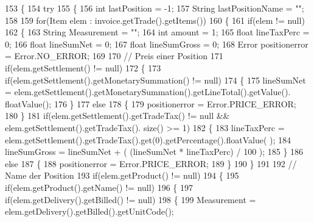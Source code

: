 \begin{DoxyCode}
153     \{
154         \textcolor{keywordflow}{try}
155         \{
156         \textcolor{keywordtype}{int} lastPosition = -1;
157         String lastPositionName = \textcolor{stringliteral}{""};
158         
159         \textcolor{keywordflow}{for}(Item elem : invoice.getTrade().getItems())
160         \{
161             \textcolor{keywordflow}{if}(elem != null)
162             \{
163                 String Measurement = \textcolor{stringliteral}{""};
164                 \textcolor{keywordtype}{int} amount = 1;
165                 \textcolor{keywordtype}{float} lineTaxPerc = 0;
166                 \textcolor{keywordtype}{float} lineSumNet = 0;
167                 \textcolor{keywordtype}{float} lineSumGross = 0;
168                 Error positionerror = Error.NO\_ERROR;
169                 
170                 \textcolor{comment}{// Preis einer Position}
171                 \textcolor{keywordflow}{if}(elem.getSettlement() != null)
172                 \{
173                     \textcolor{keywordflow}{if}(elem.getSettlement().getMonetarySummation() != null)
174                     \{
175                         lineSumNet = elem.getSettlement().getMonetarySummation().getLineTotal().getValue().
      floatValue();
176                     \}
177                     \textcolor{keywordflow}{else}
178                     \{
179                         positionerror = Error.PRICE\_ERROR;
180                     \}
181                     \textcolor{keywordflow}{if}(elem.getSettlement().getTradeTax() != null  && elem.getSettlement().getTradeTax().
      size() >= 1)
182                     \{
183                         lineTaxPerc = elem.getSettlement().getTradeTax().get(0).getPercentage().floatValue(
      );
184                         lineSumGross = lineSumNet + ( (lineSumNet * lineTaxPerc) / 100 );
185                     \}
186                     \textcolor{keywordflow}{else}
187                     \{
188                         positionerror = Error.PRICE\_ERROR;
189                     \}
190                 \}
191                 
192                 \textcolor{comment}{// Name der Position}
193                 \textcolor{keywordflow}{if}(elem.getProduct() != null)
194                 \{
195                     \textcolor{keywordflow}{if}(elem.getProduct().getName() != null)
196                     \{
197                         \textcolor{keywordflow}{if}(elem.getDelivery().getBilled() != null)
198                         \{
199                             Measurement = elem.getDelivery().getBilled().getUnitCode();

\end{DoxyCode}
